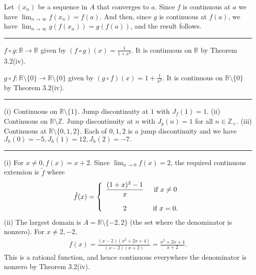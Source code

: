 \documentclass[letterpaper,10pt,english]{jupyterBook}
\begin{document}
\sphinxAtStartPar
{\hyperref[\detokenize{Problems:id15}]{}} Let \((x_{n})\) be a sequence in \(A\) that converges to \(a\). Since \(f\) is continuous at \(a\) we have \(\lim_{n\rightarrow\infty} f(x_{n}) = f(a)\). And then, since \(g\) is continuous at \(f(a)\), we have \(\lim_{n\rightarrow\infty} g(f(x_{n})) = g(f(a))\), and the result follows.


\bigskip\hrule\bigskip


\sphinxAtStartPar
{\hyperref[\detokenize{Problems:id16}]{}} \(f \circ g:\mathbb{R}\to \mathbb{R}\) given by \((f \circ g)(x) = \frac{1}{1  + x^{2}}\). It is continuous on \(\mathbb{R}\) by Theorem 3.2(iv).

\(g \circ f:\mathbb{R} \setminus \{0\} \to \mathbb{R} \setminus \{0\}\) given by \((g \circ f)(x) = {1  + \frac{1}{x^2}}\). It is continuous on \(\mathbb{R} \setminus \{0\}\) by Theorem 3.2(iv).


\bigskip\hrule\bigskip


\sphinxAtStartPar
{\hyperref[\detokenize{Problems:id17}]{}}
(i) Continuous on \(\mathbb{R} \setminus \{1\}\). Jump discontinuity at \(1\) with \(J_{f}(1) = 1\).
(ii) Continuous on \(\mathbb{R} \setminus \mathbb{Z}\). Jump discontinuity at \(n\) with \(J_{g}(n) = 1\) for all \(n\in\mathbb{Z}_+\).
(iii) Continuous at \(\mathbb{R} \setminus \{0,1,2\}\). Each of \(0, 1, 2\) is a jump discontinuity and we have \(J_{h}(0) =-5, J_{h}(1) = 12, J_{h}(2) = -7.\)


\bigskip\hrule\bigskip


\sphinxAtStartPar
{\hyperref[\detokenize{Problems:id18}]{}}

\sphinxAtStartPar
(i) For \(x \neq 0, f(x) = x+2\). Since \(\lim_{x \rightarrow 0}f(x) = 2\), the required continuous extension is \(\tilde{f}\) where
\begin{equation*}
\begin{split}
\tilde{f}(x) = \left\{\begin{array}{c c} \displaystyle\frac{(1 + x)^{2} - 1}{x} & ~\mbox{if}~x \neq 0\\ 
& \\
2 & ~\mbox{if}~x = 0. \end{array} \right.
\end{split}
\end{equation*}
\sphinxAtStartPar
(ii) The largest domain is \(A=\mathbb{R} \setminus \{-2, 2\}\) (the set where the denominator is non\sphinxhyphen{}zero). For \(x \neq 2, -2\),
\begin{equation*}
\begin{split}
f(x) = \frac{(x-2)(x^{2} + 2x + 4)}{(x-2)(x+2)}=\frac{x^{2} + 2x + 4}{x + 2}.
\end{split}
\end{equation*}
\sphinxAtStartPar
This is a rational function, and hence continuous everywhere the denominator is non\sphinxhyphen{}zero by Theorem 3.2(iv).
\end{document}
